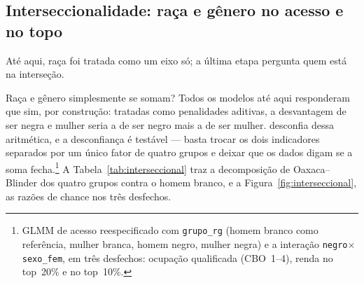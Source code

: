 \documentclass[11pt, a4paper, oneside]{article}
\begin{document}
\subsection*{Interseccionalidade: raça e gênero no acesso e no topo}
Até aqui, raça foi tratada como um eixo só; a última etapa pergunta quem está na interseção. \label{subsec:interseccional}

Raça e gênero simplesmente se somam? Todos os modelos até aqui responderam que sim,
por construção: tratadas como penalidades aditivas, a desvantagem de ser negra {e}
mulher seria a de ser negro mais a de ser mulher.  desconfia
dessa aritmética, e a desconfiança é testável --- basta trocar os dois indicadores
separados por um único fator de quatro grupos e deixar que os dados digam se a soma
fecha.\footnote{GLMM de acesso reespecificado com \texttt{grupo\_rg} (homem branco como
referência, mulher branca, homem negro, mulher negra) e a interação
\texttt{negro$\times$sexo\_fem}, em três desfechos: ocupação qualificada (CBO~1--4),
renda no top~20\% e no top~10\%.} A Tabela~\ref{tab:interseccional} traz a decomposição de Oaxaca--Blinder dos quatro grupos contra o homem branco, e a Figura~\ref{fig:interseccional}, as razões de chance nos três desfechos.
\end{document}
